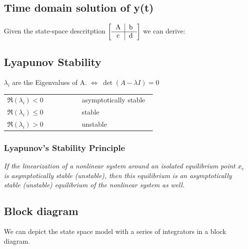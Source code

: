 \documentclass[10pt,a4paper]{scrartcl}
\begin{document}
\begin{multicols*}{3}
	\subsection{Time domain solution of y(t)}
	
	Given the state-space descritption $\left[\begin{tabular} {c|c} A & b\\ \hline  c & d\end{tabular}\right]$ we can derive:
	
	\begin{center}
	\end{center}
	
	
	
	\subsection{Lyapunov Stability}
	
	\begin{center}
	$\lambda_i$ are the Eigenvalues of A. $\Leftrightarrow\ \det(A-\lambda I)=0$
	\end{center}
	
	\begin{tabular}{p{0.47\linewidth}p{0.47\linewidth}}
	$\Re(\lambda_i)< 0$ & asymptotically stable\\
	$\Re(\lambda_i)\leq 0$ & stable \\
	$\Re(\lambda_i)>0$ & unstable
	\end{tabular}
	
	\subsubsection{Lyapunov's Stability Principle}
	
	\emph{If the linearization of a nonlinear system around an isolated equilibrium point $x_e$ is asymptotically stable (unstable), then this equilibrium is an asymptotically stable (unstable) equilibrium of the nonlinear system as well.}
	
	
	
	\subsection{Block diagram}
	
	We can depict the state space model with a series of integrators in a block diagram.
	

\end{multicols*}
\end{document}

